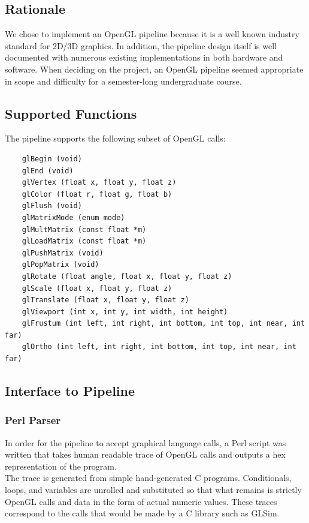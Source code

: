 \documentclass[letterpaper,10pt]{article}
\begin{document}
\subsection{Rationale}
We chose to implement an OpenGL pipeline because it is a well known industry standard for 2D/3D graphics. In addition, the pipeline design itself is well documented with numerous existing implementations in both hardware and software. When deciding on the project, an OpenGL pipeline seemed appropriate in scope and difficulty for a semester-long undergraduate course.

\subsection{Supported Functions}

The pipeline supports the following subset of OpenGL calls:
\begin{verbatim}
	glBegin (void)
	glEnd (void)
	glVertex (float x, float y, float z)
	glColor (float r, float g, float b)
	glFlush (void)
	glMatrixMode (enum mode)
	glMultMatrix (const float *m)
	glLoadMatrix (const float *m)
	glPushMatrix (void)
	glPopMatrix (void)
	glRotate (float angle, float x, float y, float z)
	glScale (float x, float y, float z)
	glTranslate (float x, float y, float z)
	glViewport (int x, int y, int width, int height)
	glFrustum (int left, int right, int bottom, int top, int near, int far)
	glOrtho (int left, int right, int bottom, int top, int near, int far)
\end{verbatim}

\subsection{Interface to Pipeline}

\subsubsection{Perl Parser}
In order for the pipeline to accept graphical language calls, a Perl script was written that takes human readable trace of OpenGL calls and outputs a hex representation of the program. \\

The trace is generated from simple hand-generated C programs. Conditionals, loops, and variables are unrolled and substituted so that what remains is strictly OpenGL calls and data in the form of actual numeric values. These traces correspond to the calls that would be made by a C library such as GLSim.\\
\end{document}

